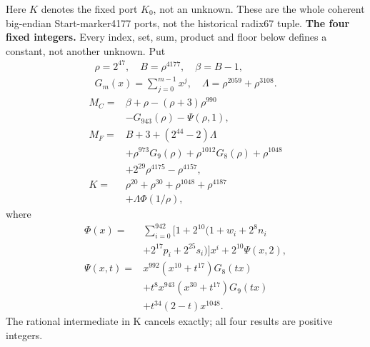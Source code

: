 \begingroup
\providecommand{\fl}[1]{\left\lfloor#1\right\rfloor}
\providecommand{\rg}[2]{\{#1,\ldots,#2\}}
Here $K$ denotes the fixed port $K_0$, not an unknown. These are the whole coherent big-endian Start-marker4177 ports, not the historical radix67 tuple.
\textbf{The four fixed integers.}
Every index, set, sum, product and floor below defines a constant, not
another unknown. Put
\[
\begin{gathered}
\rho=2^{47},\quad B=\rho^{4177},\quad\beta=B-1,\\
G_m(x)=\sum_{j=0}^{m-1}x^j,\quad
\Lambda=\rho^{2059}+\rho^{3108}.
\end{gathered}
\]
\begin{align*}
M_C={}&\beta+\rho-(\rho+3)\rho^{990}\\
&-G_{943}(\rho)-\Psi(\rho,1),\\
M_F={}&B+3+(2^{44}-2)\Lambda\\
&+\rho^{973}G_9(\rho)+\rho^{1012}G_8(\rho)
  +\rho^{1048}\\
&+2^{29}\rho^{4175}-\rho^{4157},\\
K={}&\rho^{20}+\rho^{30}+\rho^{1048}+\rho^{4187}\\
&+\Lambda\Phi(1/\rho),
\end{align*}
where
\[
\begin{split}
\Phi(x)={}&\sum_{i=0}^{942}[1+2^{10}(1+w_i+2^8n_i\\
&+2^{17}p_i+2^{25}s_i)]x^i+2^{10}\Psi(x,2),\\
\Psi(x,t)={}&x^{992}(x^{10}+t^{17})G_8(tx)\\
&+t^8x^{943}(x^{30}+t^{17})G_9(tx)\\
&+t^{34}(2-t)x^{1048}.
\end{split}
\]
The rational intermediate in K cancels exactly; all four results are positive integers.

